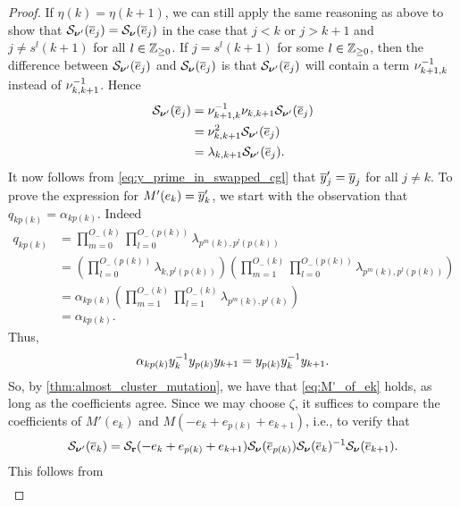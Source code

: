 \begin{proof}
	If $\eta(k) = \eta(k+1)$, we can still apply the same reasoning as above to show that
	$\mathcal{S}_{\boldsymbol{\nu}'}(\overline{e}_j) = \mathcal{S}_{\boldsymbol{\nu}}(\overline{e}_j)$ in the case that $j < k$ or $j > k+1$ and $j
		\neq s^l(k+1)$ for all $l \in \mathbb{Z}_{\geq 0}$. If $j = s^l (k+1)$ for some $l \in
		\mathbb{Z}_{\geq 0}$, then the difference between $\mathcal{S}_{\boldsymbol{\nu}'}(\overline{e}_j)$ and
	$\mathcal{S}_{\boldsymbol{\nu}}(\overline{e}_j)$ is that $\mathcal{S}_{\boldsymbol{\nu}'}(\overline{e}_j)$ will contain a term $\nu_{k+1,
			k}^{-1}$ instead of $\nu_{k, k+1}^{-1}$. Hence
	\begin{align*}
		\mathcal{S}_{\boldsymbol{\nu}'}(\overline{e}_j) & = \nu_{k+1, k}^{-1} \nu_{k, k+1} \mathcal{S}_{\boldsymbol{\nu}'}(\overline{e}_j) \\
		                    & = \nu_{k, k+1}^2 \mathcal{S}_{\boldsymbol{\nu}'}(\overline{e}_j)                \\
		                    & = \lambda_{k, k+1} \mathcal{S}_{\boldsymbol{\nu}'}(\overline{e}_j).
	\end{align*}
	It now follows from \cref{eq:y_prime_in_swapped_cgl} that $\overline{y}'_j = \overline{y}_j$ for all $j\neq k$. To prove the expression for $M'(e_k) = \overline{y}'_k$, we start with the observation that $q_{kp(k)} = \alpha_{kp(k)}$. Indeed
	\begin{align*}
		q_{kp(k)} & = \prod_{m=0}^{O_{-}(k)}\prod_{l=0}^{O_{-}(p(k))} \lambda_{p^m(k),p^l(p(k))}                                                                            \\
		          & = \left(\prod_{l = 0}^{O_{-}(p(k))}\lambda_{k, p^l(p(k))}\right)\left(\prod_{m=1}^{O_{-}(k)}\prod_{l=0}^{O_{-}(p(k))} \lambda_{p^m(k),p^l(p(k))}\right) \\
		          & = \alpha_{kp(k)}\left(\prod_{m=1}^{O_{-}(k)}\prod_{l=1}^{O_{-}(k)} \lambda_{p^m(k),p^l(k)}\right)                                                       \\
		          & = \alpha_{kp(k)}.
	\end{align*}
	Thus,
	\begin{equation*}
		\alpha_{kp(k)}y^{-1}_k y_{p(k)}y_{k+1} = y_{p(k)}y_k^{-1} y_{k+1}.
	\end{equation*}
	So, by \cref{thm:almost_cluster_mutation}, we have that \cref{eq:M'_of_ek} holds, as
	long as the coefficients agree. Since we may choose $\zeta$, it suffices to compare the
	coefficients of $M'(e_k)$ and $M(-e_k + e_{p(k)} + e_{k+1})$, i.e., to verify that
	\begin{equation*}
		\mathcal{S}_{\boldsymbol{\nu}'}(\overline{e}_k) = \mathcal{S}_{\mathbf{r}}(-e_k + e_{p(k)} + e_{k+1})\mathcal{S}_{\boldsymbol{\nu}}(\overline{e}_{p(k)})\mathcal{S}_{\boldsymbol{\nu}}(\overline{e}_k)^{-1} \mathcal{S}_{\boldsymbol{\nu}}(\overline{e}_{k+1}).
	\end{equation*}
	This follows from
	\begin{align*}

\end{align*}
\end{proof}
